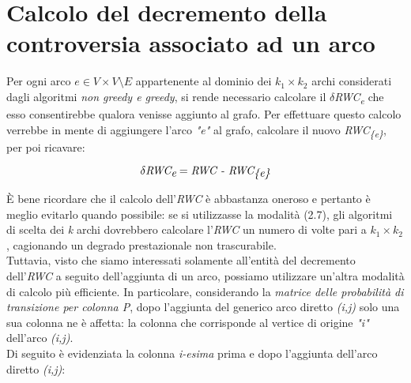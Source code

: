 \section{Calcolo del decremento della controversia associato ad un arco}

Per ogni arco \textit{$e \in V \times V \setminus E$} appartenente al dominio dei \textit{$k_1 \times k_2$} archi considerati dagli algoritmi \textit{non greedy e greedy}, si rende necessario calcolare il \textit{$\delta$RWC\textsubscript{e}} che esso consentirebbe qualora venisse aggiunto al grafo. Per effettuare questo calcolo verrebbe in mente di aggiungere l'arco \textit{"e"} al grafo, calcolare il nuovo \textit{RWC\textsubscript{\{e\}}}, per poi ricavare: 

\begin{equation}
\textit{$\delta$RWC\textsubscript{e}} = \textit{RWC - RWC\textsubscript{\{e\}}}
\end{equation}

\`E bene ricordare che il calcolo dell'\textit{RWC} è abbastanza oneroso e pertanto è meglio evitarlo quando possibile: se si utilizzasse la modalità (2.7), gli algoritmi di scelta dei \textit{k} archi dovrebbero calcolare l'\textit{RWC} un numero di volte pari a \textit{$k_1 \times k_2$}, cagionando un degrado prestazionale non trascurabile.
\\Tuttavia, visto che siamo interessati solamente all'entità del decremento dell'\textit{RWC} a seguito dell'aggiunta di un arco, possiamo utilizzare un'altra modalità di calcolo più efficiente. In particolare, considerando la \textit{matrice delle probabilità di transizione per colonna P}, dopo l'aggiunta del generico arco diretto \textit{(i,j)} solo una sua colonna ne è affetta: la colonna che corrisponde al vertice di origine \textit{"i"} dell'arco \textit{(i,j)}.
\\Di seguito è evidenziata la colonna \textit{i-esima} prima e dopo l'aggiunta dell'arco diretto \textit{(i,j)}:

